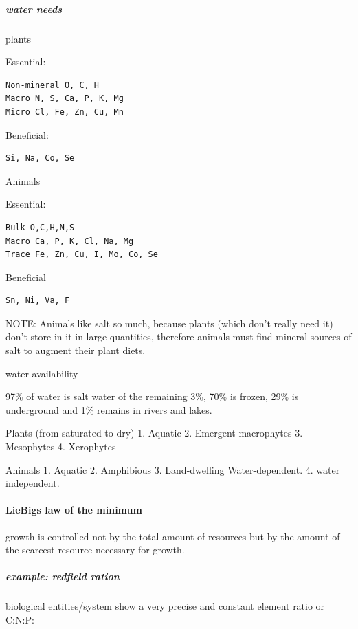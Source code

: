 \documentclass[]{article}
\let\oldparagraph\paragraph
\renewcommand{\paragraph}[1]{\oldparagraph{#1}\mbox{}}
\let\oldsubparagraph\subparagraph
\renewcommand{\subparagraph}[1]{\oldsubparagraph{#1}\mbox{}}
\begin{document}
\hypertarget{water-needs}{%
\subparagraph{water needs}\label{water-needs}}

plants

Essential:

\begin{verbatim}
Non-mineral O, C, H
Macro N, S, Ca, P, K, Mg
Micro Cl, Fe, Zn, Cu, Mn
\end{verbatim}

Beneficial:

\begin{verbatim}
Si, Na, Co, Se
\end{verbatim}

Animals

Essential:

\begin{verbatim}
Bulk O,C,H,N,S
Macro Ca, P, K, Cl, Na, Mg
Trace Fe, Zn, Cu, I, Mo, Co, Se
\end{verbatim}

Beneficial

\begin{verbatim}
Sn, Ni, Va, F
\end{verbatim}

NOTE: Animals like salt so much, because plants (which don't really need
it) don't store in it in large quantities, therefore animals must find
mineral sources of salt to augment their plant diets.

water availability

97\% of water is salt water of the remaining 3\%, 70\% is frozen, 29\%
is underground and 1\% remains in rivers and lakes.

Plants (from saturated to dry) 1. Aquatic 2. Emergent macrophytes 3.
Mesophytes 4. Xerophytes

Animals 1. Aquatic 2. Amphibious 3. Land-dwelling Water-dependent. 4.
water independent.

\hypertarget{liebigs-law-of-the-minimum}{%
\paragraph{LieBigs law of the
minimum}\label{liebigs-law-of-the-minimum}}

growth is controlled not by the total amount of resources but by the
amount of the scarcest resource necessary for growth.

\hypertarget{example-redfield-ration}{%
\subparagraph{example: redfield ration}\label{example-redfield-ration}}

biological entities/system show a very precise and constant element
ratio or C:N:P:
\end{document}
